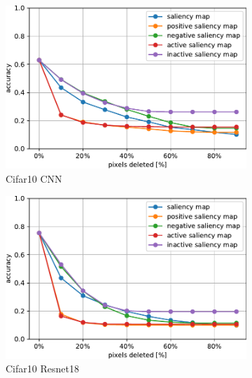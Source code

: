 \documentclass[preprint,12pt]{elsarticle}
\begin{document}
\begin{figure}[h]
    \centering
    \begin{subfigure}{0.49\linewidth}
        \centering
        \includegraphics[width=\linewidth]{../visualizations/benchmarks/black_deletion/cifar10_cnn.pdf}
        \caption{Cifar10 CNN}
    \end{subfigure}
    \hfill
    \begin{subfigure}{0.49\linewidth}
        \centering
        \includegraphics[width=\linewidth]{../visualizations/benchmarks/black_deletion/cifar10_resnet18.pdf}
        \caption{Cifar10 Resnet18}
    \end{subfigure}\\
    \hfill
    \begin{subfigure}{0.49\textwidth}
        \centering

\end{subfigure}
\end{figure}
\end{document}
